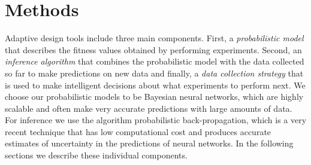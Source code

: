 \section{Methods}

Adaptive design tools include three main components. First, a
\emph{probabilistic model} that describes the fitness values obtained by
performing experiments. Second, an \emph{inference algorithm} that combines the
probabilistic model with the data collected so far to make predictions on new
data and finally, a \emph{data collection strategy} that is used to make
intelligent decisions about what experiments to perform next. We choose our
probabilistic models to be Bayesian neural networks, which are highly scalable
and often make very accurate predictions with large amounts of data. For
inference we use the algorithm probabilistic back-propagation, which is a very
recent technique that has low computational cost and produces accurate
estimates of uncertainty in the predictions of neural networks.
In the following sections we describe these individual components.




